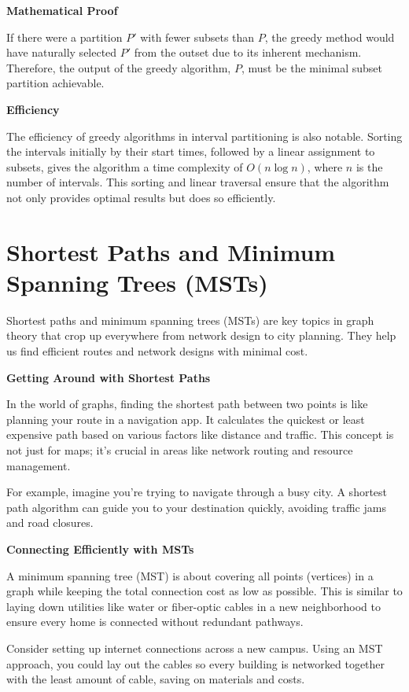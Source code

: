 \documentclass[12pt]{book} %
\begin{document}
\textbf{Mathematical Proof}

If there were a partition \( P' \) with fewer subsets than \( P \), the greedy method would have naturally selected \( P' \) from the outset due to its inherent mechanism. Therefore, the output of the greedy algorithm, \( P \), must be the minimal subset partition achievable.

\textbf{Efficiency}

The efficiency of greedy algorithms in interval partitioning is also notable. Sorting the intervals initially by their start times, followed by a linear assignment to subsets, gives the algorithm a time complexity of \( O(n \log n) \), where \( n \) is the number of intervals. This sorting and linear traversal ensure that the algorithm not only provides optimal results but does so efficiently.


\section{Shortest Paths and Minimum Spanning Trees (MSTs)}

Shortest paths and minimum spanning trees (MSTs) are key topics in graph theory that crop up everywhere from network design to city planning. They help us find efficient routes and network designs with minimal cost.

\textbf{Getting Around with Shortest Paths}

In the world of graphs, finding the shortest path between two points is like planning your route in a navigation app. It calculates the quickest or least expensive path based on various factors like distance and traffic. This concept is not just for maps; it's crucial in areas like network routing and resource management.

For example, imagine you’re trying to navigate through a busy city. A shortest path algorithm can guide you to your destination quickly, avoiding traffic jams and road closures.

\textbf{Connecting Efficiently with MSTs}

A minimum spanning tree (MST) is about covering all points (vertices) in a graph while keeping the total connection cost as low as possible. This is similar to laying down utilities like water or fiber-optic cables in a new neighborhood to ensure every home is connected without redundant pathways.

Consider setting up internet connections across a new campus. Using an MST approach, you could lay out the cables so every building is networked together with the least amount of cable, saving on materials and costs.
\end{document}
